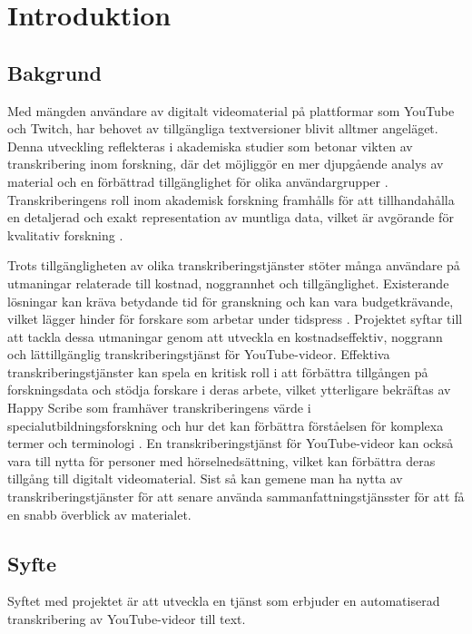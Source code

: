 \chapter{Introduktion}
\label{ch:introduction}

\section{Bakgrund}
\label{sec:background}
Med mängden användare av digitalt videomaterial på plattformar som YouTube och
Twitch, har behovet av tillgängliga textversioner blivit alltmer angeläget.
Denna utveckling reflekteras i akademiska studier som betonar vikten av
transkribering inom forskning, där det möjliggör en mer djupgående analys av
material och en förbättrad tillgänglighet för olika användargrupper
\cite{RevBlog2019}. Transkriberingens roll inom akademisk forskning
framhålls för att tillhandahålla en detaljerad och exakt representation av
muntliga data, vilket är avgörande för kvalitativ forskning
\cite{OxfordAcademicND}.

Trots tillgängligheten av olika transkriberingstjänster stöter många användare
på utmaningar relaterade till kostnad, noggrannhet och tillgänglighet.
Existerande lösningar kan kräva betydande tid för granskning och kan vara
budgetkrävande, vilket lägger hinder för forskare som arbetar under tidspress
\cite{RevBlog2019}. Projektet syftar till att tackla dessa utmaningar genom
att utveckla en kostnadseffektiv, noggrann och lättillgänglig
transkriberingstjänst för YouTube-videor. Effektiva transkriberingstjänster
kan spela en kritisk roll i att förbättra tillgången på forskningsdata och
stödja forskare i deras arbete, vilket ytterligare bekräftas av Happy Scribe
som framhäver transkriberingens värde i specialutbildningsforskning och hur
det kan förbättra förståelsen för komplexa termer och terminologi
\cite{HappyScribeND}. En transkriberingstjänst för YouTube-videor kan också
vara till nytta för personer med hörselnedsättning, vilket kan förbättra deras
tillgång till digitalt videomaterial. Sist så kan gemene man ha nytta av
transkriberingstjänster för att senare använda sammanfattningstjänsster för
att få en snabb överblick av materialet.

\section{Syfte}
\label{sec:purpose}
Syftet med projektet är att utveckla en tjänst som erbjuder en automatiserad
transkribering av YouTube-videor till text. 

